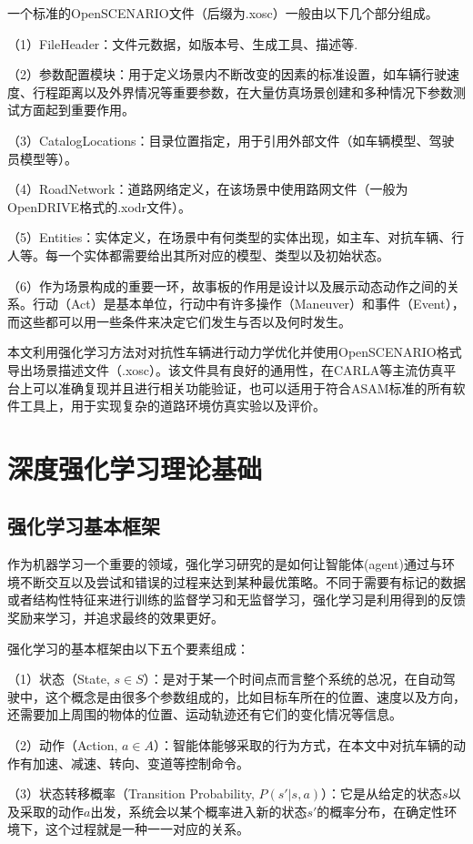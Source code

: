 一个标准的OpenSCENARIO文件（后缀为.xosc）一般由以下几个部分组成。

（1）FileHeader：文件元数据，如版本号、生成工具、描述等.

（2）参数配置模块：用于定义场景内不断改变的因素的标准设置，如车辆行驶速度、行程距离以及外界情况等重要参数，在大量仿真场景创建和多种情况下参数测试方面起到重要作用。

（3）CatalogLocations：目录位置指定，用于引用外部文件（如车辆模型、驾驶员模型等）。

（4）RoadNetwork：道路网络定义，在该场景中使用路网文件（一般为OpenDRIVE格式的.xodr文件）。

（5）Entities：实体定义，在场景中有何类型的实体出现，如主车、对抗车辆、行人等。每一个实体都需要给出其所对应的模型、类型以及初始状态。

（6）作为场景构成的重要一环，故事板的作用是设计以及展示动态动作之间的关系。行动（Act）是基本单位，行动中有许多操作（Maneuver）和事件（Event），而这些都可以用一些条件来决定它们发生与否以及何时发生。

本文利用强化学习方法对对抗性车辆进行动力学优化并使用OpenSCENARIO格式导出场景描述文件（.xosc）。该文件具有良好的通用性，在CARLA等主流仿真平台上可以准确复现并且进行相关功能验证，也可以适用于符合ASAM标准的所有软件工具上，用于实现复杂的道路环境仿真实验以及评价。
\section{深度强化学习理论基础}
\subsection{强化学习基本框架}
作为机器学习一个重要的领域，强化学习研究的是如何让智能体(agent)通过与环境不断交互以及尝试和错误的过程来达到某种最优策略。不同于需要有标记的数据或者结构性特征来进行训练的监督学习和无监督学习，强化学习是利用得到的反馈奖励来学习，并追求最终的效果更好\cite{pan2021reinforcement}。

强化学习的基本框架由以下五个要素组成：

（1）状态（State, $s ∈ S$）：是对于某一个时间点而言整个系统的总况，在自动驾驶中，这个概念是由很多个参数组成的，比如目标车所在的位置、速度以及方向，还需要加上周围的物体的位置、运动轨迹还有它们的变化情况等信息。

（2）动作（Action, $a ∈ A$）：智能体能够采取的行为方式，在本文中对抗车辆的动作有加速、减速、转向、变道等控制命令。

（3）状态转移概率（Transition Probability, $P(s'|s,a)$）：它是从给定的状态$s$以及采取的动作$a$出发，系统会以某个概率进入新的状态$s'$的概率分布，在确定性环境下，这个过程就是一种一一对应的关系。

